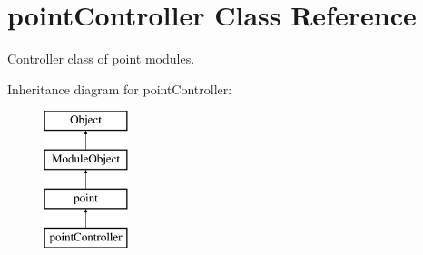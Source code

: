 \hypertarget{classpointController}{}\section{point\+Controller Class Reference}
\label{classpointController}


Controller class of point modules.  


Inheritance diagram for point\+Controller\+:\begin{figure}[H]
\begin{center}
\leavevmode
\includegraphics[height=4.000000cm]{classpointController}
\end{center}
\end{figure}
